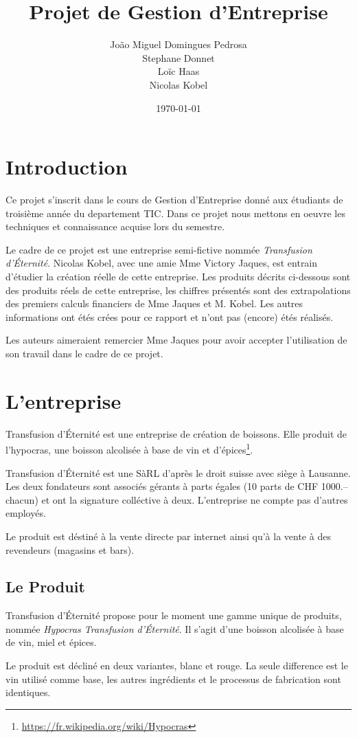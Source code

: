 \documentclass[10pt,a4paper]{article}
\title{Projet de Gestion d'Entreprise}
\subtitle{\tde{}}
\author{João Miguel Domingues Pedrosa \\ Stephane Donnet \\ Loïc Haas \\ Nicolas Kobel}
\date{\today}
\newcommand{\tde}{Transfusion d'Éternité}
\begin{document}
\maketitle
\tableofcontents
\newpage
\section{Introduction}
Ce projet s'inscrit dans le cours de Gestion d'Entreprise donné aux étudiants de troisième année du departement TIC.
Dans ce projet nous mettons en oeuvre les techniques et connaissance acquise lors du semestre.

Le cadre de ce projet est une entreprise semi-fictive nommée \textit{\tde{}}.
Nicolas Kobel, avec une amie Mme Victory Jaques, est entrain d'étudier la création réelle de cette entreprise.
Les produits décrits ci-dessous sont des produits réels de cette entreprise, les chiffres présentés sont des extrapolations des premiers calculs financiers de Mme Jaques et M. Kobel.
Les autres informations ont étés crées pour ce rapport et n'ont pas (encore) étés réalisés.

Les auteurs aimeraient remercier Mme Jaques pour avoir accepter l'utilisation de son travail dans le cadre de ce projet.
\newpage
\section{L'entreprise}
\tde{} est une entreprise de création de boissons.
Elle produit de l'hypocras, une boisson alcolisée à base de vin et d'épices\footnote{\url{https://fr.wikipedia.org/wiki/Hypocras}}.

\tde{} est une SàRL d'après le droit suisse avec siège à Lausanne.
Les deux fondateurs sont associés gérants à parts égales (10 parts de CHF 1000.-- chacun) et ont la signature colléctive à deux.
L'entreprise ne compte pas d'autres employés.

Le produit est déstiné à la vente directe par internet ainsi qu'à la vente à des revendeurs (magasins et bars).
\subsection{Le Produit}
\tde{} propose pour le moment une gamme unique de produits, nommée \textit{Hypocras \tde{}}.
Il s'agit d'une boisson alcolisée à base de vin, miel et épices.

Le produit est décliné en deux variantes, blanc et rouge.
La seule difference est le vin utilisé comme base, les autres ingrédients et le processus de fabrication sont identiques.
\end{document}
